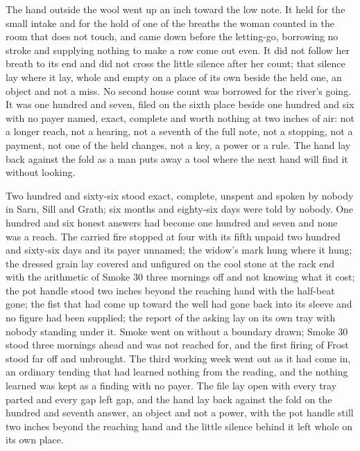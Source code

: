 The hand outside the wool went up an inch toward the low note. It held for the small intake and for the hold of one of the breaths the woman counted in the room that does not touch, and came down before the letting-go, borrowing no stroke and supplying nothing to make a row come out even. It did not follow her breath to its end and did not cross the little silence after her count; that silence lay where it lay, whole and empty on a place of its own beside the held one, an object and not a miss. No second house count was borrowed for the river's going. It was one hundred and seven, filed on the sixth place beside one hundred and six with no payer named, exact, complete and worth nothing at two inches of air: not a longer reach, not a hearing, not a seventh of the full note, not a stopping, not a payment, not one of the held changes, not a key, a power or a rule. The hand lay back against the fold as a man puts away a tool where the next hand will find it without looking.

Two hundred and sixty-six stood exact, complete, unspent and spoken by nobody in Sarn, Sill and Grath; six months and eighty-six days were told by nobody. One hundred and six honest answers had become one hundred and seven and none was a reach. The carried fire stopped at four with its fifth unpaid two hundred and sixty-six days and its payer unnamed; the widow's mark hung where it hung; the dressed grain lay covered and unfigured on the cool stone at the rack end with the arithmetic of Smoke 30 three mornings off and not knowing what it cost; the pot handle stood two inches beyond the reaching hand with the half-beat gone; the fist that had come up toward the well had gone back into its sleeve and no figure had been supplied; the report of the asking lay on its own tray with nobody standing under it. Smoke went on without a boundary drawn; Smoke 30 stood three mornings ahead and was not reached for, and the first firing of Frost stood far off and unbrought. The third working week went out as it had come in, an ordinary tending that had learned nothing from the reading, and the nothing learned was kept as a finding with no payer. The file lay open with every tray parted and every gap left gap, and the hand lay back against the fold on the hundred and seventh answer, an object and not a power, with the pot handle still two inches beyond the reaching hand and the little silence behind it left whole on its own place.
